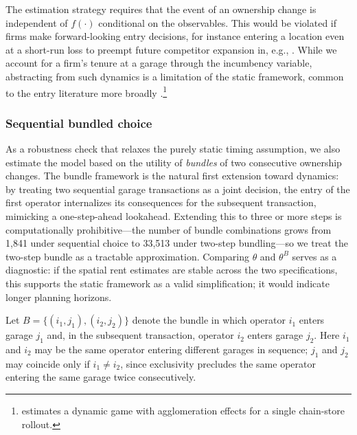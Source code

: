 \documentclass[12pt]{article}
\begin{document}
The estimation strategy requires that the event of an ownership change is 
independent of $f(\cdot)$ conditional on the observables. This would be violated if firms make forward-looking entry 
decisions, for instance entering a location even at a short-run loss to 
preempt future competitor expansion in, e.g., \citep{goolsbee2008incumbents, zheng2016spatial}. While we account for a firm's tenure 
at a garage through the incumbency variable, abstracting from such dynamics 
is a limitation of the static framework, common to the entry literature more 
broadly \citep{Jia2008, ellickson2013estimating, nishida2015estimating}.\footnote{
\cite{Holmes2011} estimates a dynamic game with agglomeration effects for 
a single chain-store rollout.}

\subsubsection{Sequential bundled choice}\label{sec:seq-bundle}
As a robustness check that relaxes the purely static timing assumption, we 
also estimate the model based on the utility of \emph{bundles} of two 
consecutive ownership changes. The bundle framework is the natural first 
extension toward dynamics: by treating two sequential garage transactions as 
a joint decision, the entry of the first operator internalizes its 
consequences for the subsequent transaction, mimicking a one-step-ahead 
lookahead. Extending this to three or more steps is computationally 
prohibitive---the number of bundle combinations grows from 1,841 under 
sequential choice to 33,513 under two-step bundling---so we treat the 
two-step bundle as a tractable approximation. Comparing $\theta$ and 
$\theta^B$ serves as a diagnostic: if the spatial rent estimates are stable 
across the two specifications, this supports the static framework as a valid 
simplification; it would indicate longer planning horizons.

Let $B=\{(i_1,j_1),(i_2,j_2)\}$ denote the bundle in which operator $i_1$ 
enters garage $j_1$ and, in the subsequent transaction, operator $i_2$ enters 
garage $j_2$. Here $i_1$ and $i_2$ may be the same operator entering different 
garages in sequence; $j_1$ and $j_2$ may coincide only if $i_1 \neq i_2$, 
since exclusivity precludes the same operator entering the same garage twice 
consecutively. %
\end{document}

